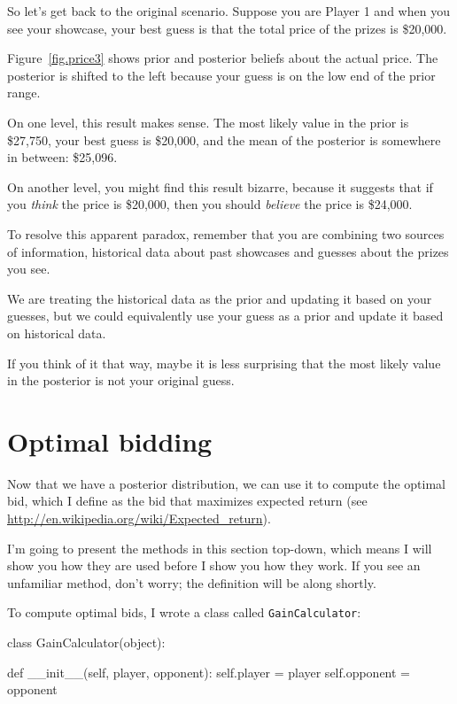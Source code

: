 \documentclass[12pt]{book}
\theoremstyle{exercise}
\begin{document}
So let's get back to the original scenario.  Suppose you are
Player 1 and when you see your showcase, your best guess is
that the total price of the prizes is \$20,000.

Figure~\ref{fig.price3} shows prior and
posterior beliefs about the actual price.
The posterior is shifted
to the left because your guess 
is on the low end of the prior range.

On one level, this result makes sense.  The most likely value
in the prior is \$27,750, your best guess is \$20,000, and
the mean of the posterior is somewhere in between: \$25,096.

On another level, you might find this result bizarre, because it
suggests that if you {\em think} the price is \$20,000, then you
should {\em believe} the price is \$24,000.

To resolve this apparent paradox, remember that you are combining two
sources of information, historical data about past showcases and
guesses about the prizes you see.

We are treating the historical data as the prior and updating it
based on your guesses, but we could equivalently use your guess
as a prior and update it based on historical data.  

If you think of it that way, maybe it is less surprising that the
most likely value in the posterior is not your original guess.


\section{Optimal bidding}

Now that we have a posterior distribution, we can use it to
compute the optimal bid, which I define as the bid that maximizes
expected return (see \url{http://en.wikipedia.org/wiki/Expected_return}).

I'm going to present the methods in this section top-down, which
means I will show you how they are used before I show you how they
work.  If you see an unfamiliar method, don't worry; the definition
will be along shortly.

To compute optimal bids, I wrote a class called {\tt GainCalculator}:

\begin{code}
class GainCalculator(object):

    def __init__(self, player, opponent):
        self.player = player
        self.opponent = opponent
\end{code}
\end{document}
